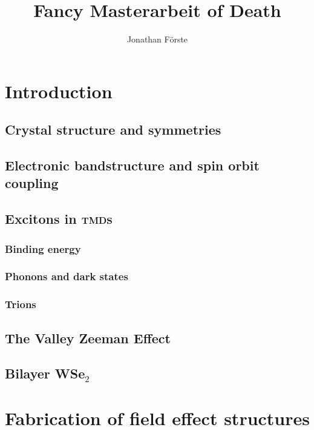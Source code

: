 \documentclass{scrbook}
\title{Fancy Masterarbeit of Death}
\author{Jonathan Förste}
\begin{document}
\maketitle
\tableofcontents
\chapter{Introduction}

	\section{Crystal structure and symmetries}
	\section{Electronic bandstructure and spin orbit coupling}
	\section{Excitons in \textsc{tmd}s}
		\subsection{Binding energy}
		\subsection{Phonons and dark states}
		\subsection{Trions}
	\section{The Valley Zeeman Effect}
	\section{Bilayer WSe$_2$}
\chapter{Fabrication of field effect structures}
	


\end{document}

